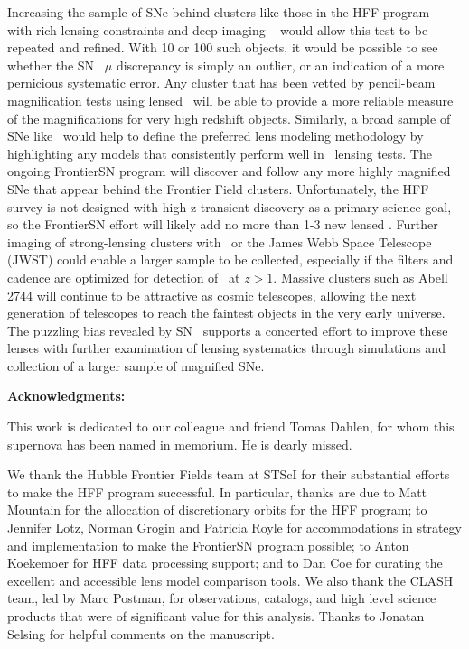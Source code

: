 Increasing the sample of SNe behind clusters like those in
the HFF program -- with rich lensing constraints and deep imaging -- 
would allow this test to be repeated and refined.  With 10 or 100 such
objects, it would be possible to see whether the SN \tomas\ $\mu$
discrepancy is simply an outlier, or an indication of a more
pernicious systematic error.  Any cluster that has been vetted by
pencil-beam magnification tests using lensed \SNIa\ will be able to
provide a more reliable measure of the magnifications for very high
redshift objects.  Similarly, a broad sample of SNe like \tomas\ would
help to define the preferred lens modeling methodology by highlighting
any models that consistently perform well in \SNIa\ lensing tests.
The ongoing FrontierSN program will discover and follow any more
highly magnified SNe that appear behind the Frontier Field
clusters. Unfortunately, the HFF survey is not designed with high-z
transient discovery as a primary science goal, so the FrontierSN
effort will likely add no more than 1-3 new lensed \SNIa. Further
imaging of strong-lensing clusters with \HST\ or the James Webb Space
Telescope (JWST) could enable a larger sample to be collected,
especially if the filters and cadence are optimized for detection
of \SNIa\ at $z>1$.  Massive clusters such as Abell 2744 will continue
to be attractive as cosmic telescopes, allowing the next generation of
telescopes to reach the faintest objects in the very early universe.
The puzzling bias revealed by SN \tomas\ supports a concerted effort
to improve these lenses with further examination of lensing
systematics through simulations and collection of a larger sample of
magnified SNe.


\bigskip


{\bf Acknowledgments:}

This work is dedicated to our colleague and friend Tomas Dahlen, for
whom this supernova has been named in memorium. He is dearly missed.

We thank the Hubble Frontier Fields team at STScI for their
substantial efforts to make the HFF program successful.  In
particular, thanks are due to Matt Mountain for the allocation of
discretionary orbits for the HFF program; to Jennifer Lotz, Norman
Grogin and Patricia Royle for accommodations in strategy and
implementation to make the FrontierSN program possible; to Anton
Koekemoer for HFF data processing support; and to Dan Coe for curating the
excellent and accessible lens model comparison tools.  We also thank
the CLASH team, led by Marc Postman, for observations, catalogs, and
high level science products that were of significant value for this
analysis.  Thanks to Jonatan Selsing for helpful comments on the
manuscript.


